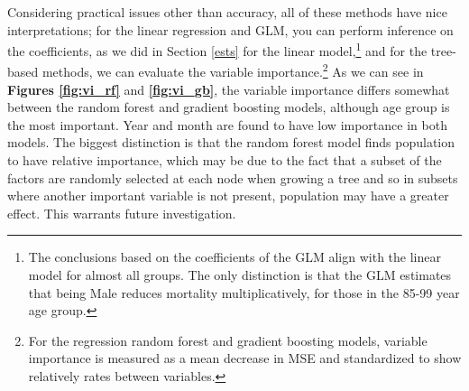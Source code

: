 \documentclass[letterpaper, 11pt]{article}
\begin{document}
Considering practical issues other than accuracy, all of these methods have nice interpretations; for the linear regression and GLM, you can perform inference on the coefficients, as we did in Section \ref{ests} for the linear model,\footnote{The conclusions based on the coefficients of the GLM align with the linear model for almost all groups. The only distinction is that the GLM estimates that being Male reduces mortality multiplicatively, for those in the 85-99 year age group.} and for the tree-based methods, we can evaluate the variable importance.\footnote{For the regression random forest and gradient boosting models, variable importance is measured as a mean decrease in MSE and standardized to show relatively rates between variables.} As we can see in \textbf{Figures \ref{fig:vi_rf}} and \textbf{\ref{fig:vi_gb}}, the variable importance differs somewhat between the random forest and gradient boosting models, although age group is the most important. Year and month are found to have low importance in both models. The biggest distinction is that the random forest model finds population to have relative importance, which may be due to the fact that a subset of the factors are randomly selected at each node when growing a tree and so in subsets where another important variable is not present, population may have a greater effect. This warrants future investigation.
\end{document}
